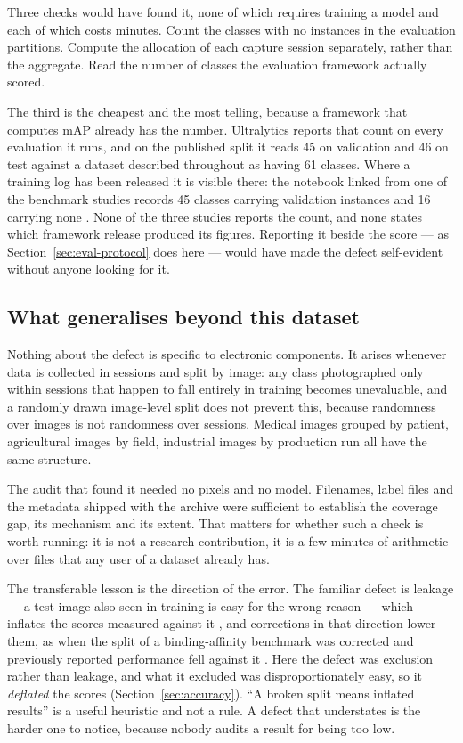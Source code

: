 Three checks would have found it, none of which requires training a model and
each of which costs minutes. Count the classes with no instances in the
evaluation partitions. Compute the allocation of each capture session
separately, rather than the aggregate. Read the number of classes the evaluation
framework actually scored.

The third is the cheapest and the most telling, because a framework that computes
mAP already has the number. Ultralytics reports that count on every evaluation it
runs, and on the published split it reads 45 on validation and 46 on test against
a dataset described throughout as having 61 classes. Where a training log has
been released it is visible there: the notebook linked from one of the benchmark
studies records 45 classes carrying validation instances and 16 carrying none
\citep{yolov12notebook}. None of the three studies reports the count, and none
states which framework release produced its figures.
Reporting it beside the score --- as Section~\ref{sec:eval-protocol} does here
--- would have made
the defect self-evident without anyone looking for it.

\subsection{What generalises beyond this dataset}
\label{sec:generalisation}

Nothing about the defect is specific to electronic components. It arises
whenever data is collected in sessions and split by image: any class
photographed only within sessions that happen to fall entirely in training
becomes unevaluable, and a randomly drawn image-level split does not prevent
this, because randomness over images is not randomness over sessions. Medical
images grouped by patient, agricultural images by field, industrial images by
production run all have the same structure.

The audit that found it needed no pixels and no model. Filenames, label files
and the metadata shipped with the archive were sufficient to establish the
coverage gap, its mechanism and its extent. That matters for whether such a
check is worth running: it is not a research contribution, it is a few minutes
of arithmetic over files that any user of a dataset already has.

The transferable lesson is the direction of the error. The familiar defect is
leakage --- a test image also seen in training is easy for the wrong reason ---
which inflates the scores measured against it \citep{kapoor2023leakage}, and
corrections in that direction lower them, as when the split of a
binding-affinity benchmark was corrected and previously reported performance
fell against it
\citep{graber2025resolving}. Here the defect was exclusion
rather than leakage, and what it excluded was disproportionately easy, so it
\emph{deflated} the scores (Section~\ref{sec:accuracy}). ``A broken split means
inflated results'' is a useful heuristic and not a rule. A defect that
understates is the harder one to notice, because nobody audits a result for
being too low.

